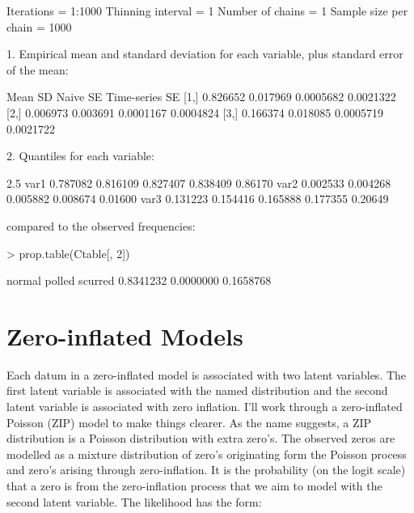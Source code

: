 \documentclass{article}
\begin{document}
\begin{Schunk}
\begin{Soutput}
Iterations = 1:1000
Thinning interval = 1 
Number of chains = 1 
Sample size per chain = 1000 

1. Empirical mean and standard deviation for each variable,
   plus standard error of the mean:

         Mean       SD  Naive SE Time-series SE
[1,] 0.826652 0.017969 0.0005682      0.0021322
[2,] 0.006973 0.003691 0.0001167      0.0004824
[3,] 0.166374 0.018085 0.0005719      0.0021722

2. Quantiles for each variable:

         2.5%
var1 0.787082 0.816109 0.827407 0.838409 0.86170
var2 0.002533 0.004268 0.005882 0.008674 0.01600
var3 0.131223 0.154416 0.165888 0.177355 0.20649
\end{Soutput}
\end{Schunk}

compared to the observed frequencies:

\begin{Schunk}
\begin{Sinput}
> prop.table(Ctable[, 2])
\end{Sinput}
\begin{Soutput}
   normal    polled   scurred 
0.8341232 0.0000000 0.1658768 
\end{Soutput}
\end{Schunk}


\section{Zero-inflated Models}

Each datum in a zero-inflated model is associated with two latent variables. The first latent variable is associated with the named distribution and the second latent variable is associated with zero inflation. I'll work through a zero-inflated Poisson (ZIP) model to make things clearer. As the name suggests, a ZIP distribution is a Poisson distribution with extra zero's. The observed zeros are modelled as a mixture distribution of zero's originating form the Poisson process and zero's arising through zero-inflation. It is the probability (on the logit scale) that a zero is from the zero-inflation process that we aim to model with the second latent variable. The likelihood has the form:
\end{document}
